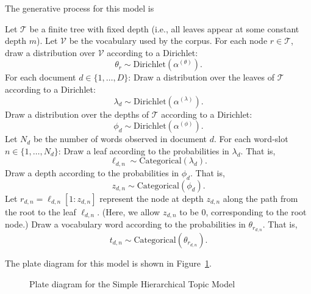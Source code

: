 \documentclass{article}
\begin{document}
The generative process for this model is
\begin{outline}
\1 Let $\mathcal T$ be a finite tree with fixed depth (i.e., all leaves appear at some constant depth $m$).
\1 Let $\mathcal V$ be the vocabulary used by the corpus.
\1 For each node $r \in \mathcal T$, draw a distribution over $\mathcal V$ according to a Dirichlet:
\[ \theta_r \sim \text{Dirichlet}(\alpha^{(\theta)}). \]
\1 For each document $d \in \{1, \ldots, D\}$:
  \2 Draw a distribution over the leaves of $\mathcal T$ according to a Dirichlet:
  \[ \lambda_d \sim \text{Dirichlet}(\alpha^{(\lambda)}). \]
  \2 Draw a distribution over the depths of $\mathcal T$ according to a Dirichlet:
  \[ \phi_d \sim \text{Dirichlet}(\alpha^{(\phi)}). \]
  \2 Let $N_d$ be the number of words observed in document $d$.
  \2 For each word-slot $n \in \{1, \ldots, N_d\}$:
    \3 Draw a leaf according to the probabilities in $\lambda_d$.  That is,
    \[ \ell_{d,n} \sim \text{Categorical}(\lambda_d). \]
    \3 Draw a depth according to the probabilities in $\phi_d$.  That is,
    \[ z_{d,n} \sim \text{Categorical}(\phi_d). \]
    \3 Let $r_{d,n} = \ell_{d,n}[1:z_{d,n}]$ represent the node at depth $z_{d,n}$ along the path from the root to the leaf $\ell_{d,n}$.  (Here, we allow $z_{d,n}$ to be $0$, corresponding to the root node.)
    \3 Draw a vocabulary word according to the probabilities in $\theta_{r_{d,n}}$.  That is,
    \[ t_{d,n} \sim \text{Categorical}(\theta_{r_{d,n}}). \]
\end{outline}

The plate diagram for this model is shown in Figure~\ref{fig:plate-simple}.

\begin{figure}[htb]
%
\centering
{}
%
\caption{Plate diagram for the Simple Hierarchical Topic Model}
\label{fig:plate-simple}
\end{figure}
\end{document}
